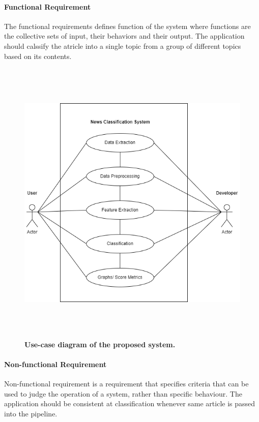 \documentclass[12pt]{report}
\begin{document}
                \paragraph{Functional Requirement}
                The functional requirements defines function of the system where functions are the collective sets of
                input, their behaviors and their output.
                    The application should calssify the atricle into a single topic from a group of different topics based on its contents.
                    \begin{figure}[h]
                        \centering
                        \includegraphics[width=15.29cm, height=14cm]{use_case.drawio.png}
                        \caption{\textbf{Use-case diagram of the proposed system.}}
                    \end{figure}
                    \newpage


                \paragraph{Non-functional Requirement}
                Non-functional requirement is a requirement that specifies criteria that can be used to judge the
                operation of a system, rather than specific behaviour.
                    The application should be consistent at classification whenever same article is passed into  the pipeline.
\end{document}
